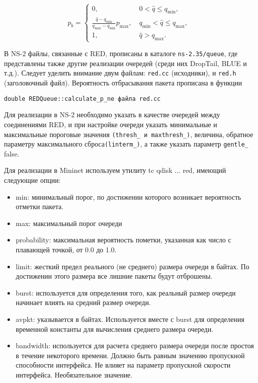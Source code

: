 \begin{equation}
\label{eq2:1}
p_{b} = \begin{cases}
        0, &  \ 0 < \hat{q} \leqslant q_{\min},
        \\
        \frac{\hat{q} - q_{\min}}{q_{\max} - q_{\min}} p_{\max}, & \ q_{\min} < \hat{q} \leqslant q_{\max}, 
        \\
        1, &  \ \hat{q} > q_{\max}.
\end{cases}                                     
\end{equation}


В NS-2 файлы, связанные с RED, прописаны в каталоге
\verb|ns-2.35/queue|, где представлены также другие реализации
очередей (среди них DropTail, BLUE и т.д.). Следует уделить внимание
двум файлам: \verb|red.cc| (исходники), и \verb|red.h| (заголовочный
файл). Вероятность отбрасывания пакета прописана в функции

\verb|double REDQueue::calculate_p_ne файла red.cc|

Для реализации в NS-2 необходимо указать в качестве очередей между соединениями
RED, и при настройке очереди указать минимальные и максимальные пороговые значения 
\verb|(thresh_ и maxthresh_)|, величина, обратное параметру максимального сброса\verb|(linterm_)|, 
а также указать параметр \verb|gentle_| false. 




Для реализации в Mininet используем утилиту tc qdisk ... red, имеющий следующие опции:
\begin{itemize}
\item min: минимальный порог, по достижении которого возникает вероятность отметки пакета.
\item max: максимальный порог очереди
\item probability: максимальная вероятность пометки, указанная как число с плавающей точкой, от 0.0 до 1.0. 
\item limit: жесткий предел реального (не среднего) размера очереди в байтах. По достижении этого размера все лишние пакеты будут отброшены.
\item burst: используется для определения того, как реальный размер очереди начинает влиять на средний размер очереди. 
\item avpkt: указывается в байтах. Используется вместе с burst для определения временной константы для вычисления среднего размера очереди.
\item bandwidth: используется для расчета среднего размера очереди после простоя в течение некоторого времени. Должно быть равным значению пропускной способности интерфейса. Не влияет на параметр пропускной скорости интерфейса. Необязательное значение.

\end{itemize}

